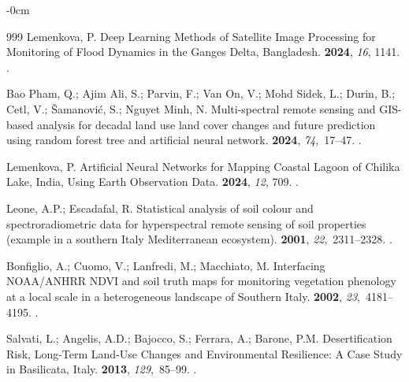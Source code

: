 \documentclass[jimaging,article,accept,pdftex,oneauthor]{Definitions/mdpi}
\begin{document}
\begin{adjustwidth}{-\extralength}{0cm}
\begin{thebibliography}{999}
Lemenkova, P.
\newblock Deep Learning Methods of Satellite Image Processing for Monitoring of
  Flood Dynamics in the Ganges Delta, Bangladesh.
 {\bf 2024}, {\em 16}, {1141}.
.

{Bao Pham}, Q.; {Ajim Ali}, S.; Parvin, F.; {Van On}, V.; {Mohd Sidek}, L.;
  Durin, B.; Cetl, V.; Šamanović, S.; {Nguyet Minh}, N.
\newblock Multi-spectral remote sensing and GIS-based analysis for decadal land
  use land cover changes and future prediction using random forest tree and
  artificial neural network.
 {\bf 2024}, {\em 74},~17--47.
.

Lemenkova, P.
\newblock Artificial Neural Networks for Mapping Coastal Lagoon of Chilika
  Lake, India, Using Earth Observation Data.
 {\bf 2024}, {\em 12}, {709}.
.

Leone, A.P.; Escadafal, R.
\newblock Statistical analysis of soil colour and spectroradiometric data for
  hyperspectral remote sensing of soil properties (example in a southern Italy
  Mediterranean ecosystem).
 {\bf 2001}, {\em
  22},~2311--2328.
.

Bonfiglio, A.; Cuomo, V.; Lanfredi, M.; Macchiato, M.
\newblock Interfacing NOAA/ANHRR NDVI and soil truth maps for monitoring
  vegetation phenology at a local scale in a heterogeneous landscape of
  Southern Italy.
 {\bf 2002}, {\em
  23},~4181--4195.
.

Salvati, L.; Angelis, A.D.; Bajocco, S.; Ferrara, A.; Barone, P.M.
\newblock Desertification Risk, Long-Term Land-Use Changes and Environmental
  Resilience: A Case Study in Basilicata, Italy.
 {\bf 2013}, {\em 129},~85--99.
.


\end{thebibliography}
\end{adjustwidth}
\end{document}
